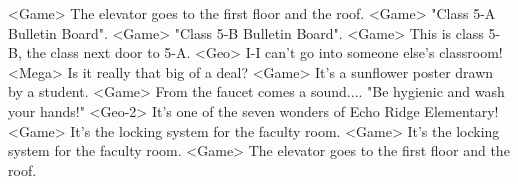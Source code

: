 <Game> The elevator goes to the first floor and the roof. 
<Game> "Class 5-A Bulletin Board". 
<Game> "Class 5-B Bulletin Board". 
<Game> This is class 5-B, the class next door to 5-A. 
<Geo> I-I can't go into someone else's classroom! 
<Mega> Is it really that big of a deal? 
<Game> It's a sunflower poster drawn by a student. 
<Game> From the faucet comes a sound.... 
"Be hygienic and wash your hands!" 
<Geo-2> It's one of the seven wonders of Echo Ridge Elementary! 
<Game> It's the locking system for the faculty room. 
<Game> It's the locking system for the faculty room. 
<Game> The elevator goes to the first floor and the roof. 

